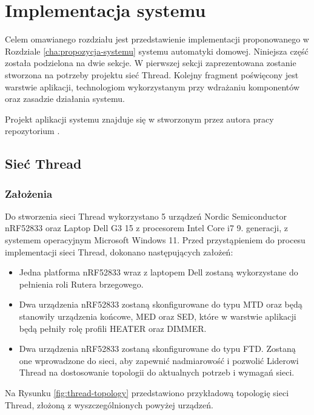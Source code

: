 \chapter{Implementacja systemu}
\label{cha:implementacja}

Celem omawianego rozdziału jest przedstawienie implementacji proponowanego w Rozdziale \ref{cha:propozycja-systemu} systemu automatyki domowej. Niniejsza część została podzielona na dwie sekcje. W pierwszej sekcji zaprezentowana zostanie stworzona na potrzeby projektu sieć Thread. Kolejny fragment poświęcony jest warstwie aplikacji, technologiom wykorzystanym przy wdrażaniu komponentów oraz zasadzie działania systemu.

Projekt aplikacji systemu znajduje się w stworzonym przez autora pracy repozytorium \cite{project-repo}.

\section{Sieć Thread}

    \subsection{Założenia}
    \label{sec:thread-network-assumptions}
    
        Do stworzenia sieci Thread wykorzystano 5 urządzeń Nordic Semiconductor nRF52833 oraz Laptop Dell G3 15 z procesorem Intel Core i7 9. generacji, z systemem operacyjnym Microsoft Windows 11. Przed przystąpieniem do procesu implementacji sieci Thread, dokonano następujących założeń:
        \begin{itemize}
            \item Jedna platforma nRF52833 wraz z laptopem Dell zostaną wykorzystane do pełnienia roli Rutera brzegowego.
            \item Dwa urządzenia nRF52833 zostaną skonfigurowane do typu MTD oraz będą stanowiły urządzenia końcowe, MED oraz SED, które w warstwie aplikacji będą pełniły rolę profili HEATER oraz DIMMER.
            \item Dwa urządzenia nRF52833 zostaną skonfigurowane do typu FTD. Zostaną one wprowadzone do sieci, aby zapewnić nadmiarowość i pozwolić Liderowi Thread na dostosowanie topologii do aktualnych potrzeb i wymagań sieci.
        \end{itemize}

        Na Rysunku \ref{fig:thread-topology} przedstawiono przykładową topologię sieci Thread, złożoną z wyszczególnionych powyżej urządzeń.

